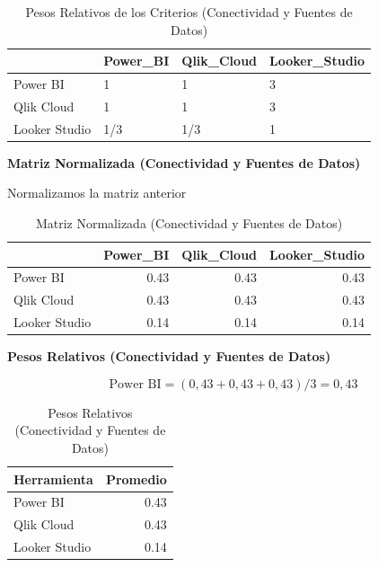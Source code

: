 \documentclass[
  11pt,
  bookmarksnumbered]{article}
\begin{document}
\begin{table}[H]

\caption{\label{tab:unnamed-chunk-30}Pesos Relativos de los Criterios (Conectividad y Fuentes de Datos)}
\centering
\fontsize{12}{14}\selectfont
\begin{tabular}[t]{l|l|l|l}
\hline
  & Power\_BI & Qlik\_Cloud & Looker\_Studio\\
\hline
Power BI & 1 & 1 & 3\\
\hline
Qlik Cloud & 1 & 1 & 3\\
\hline
Looker Studio & 1/3 & 1/3 & 1\\
\hline
\end{tabular}
\end{table}

\textbf{Matriz Normalizada (Conectividad y Fuentes de Datos)}

Normalizamos la matriz anterior

\begin{table}[H]

\caption{\label{tab:unnamed-chunk-31}Matriz Normalizada (Conectividad y Fuentes de Datos)}
\centering
\fontsize{12}{14}\selectfont
\begin{tabular}[t]{l|r|r|r}
\hline
  & Power\_BI & Qlik\_Cloud & Looker\_Studio\\
\hline
Power BI & 0.43 & 0.43 & 0.43\\
\hline
Qlik Cloud & 0.43 & 0.43 & 0.43\\
\hline
Looker Studio & 0.14 & 0.14 & 0.14\\
\hline
\end{tabular}
\end{table}

\textbf{Pesos Relativos (Conectividad y Fuentes de Datos)}

\[
\text{Power BI}= (0,43+0,43+0,43) / 3 = 0,43
\]

\begin{table}[H]

\caption{\label{tab:unnamed-chunk-32}Pesos Relativos (Conectividad y Fuentes de Datos)}
\centering
\fontsize{12}{14}\selectfont
\begin{tabular}[t]{l|r}
\hline
Herramienta & Promedio\\
\hline
Power BI & 0.43\\
\hline
Qlik Cloud & 0.43\\
\hline
Looker Studio & 0.14\\
\hline
\end{tabular}
\end{table}
\end{document}
